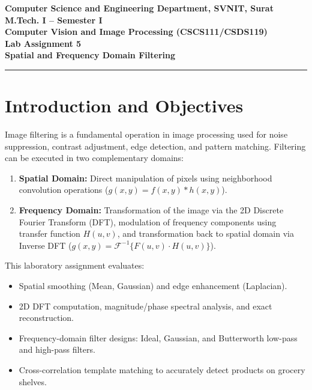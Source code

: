 \documentclass[12pt]{article}
\begin{document}

\begin{center}
\textbf{Computer Science and Engineering Department, SVNIT, Surat}\\
\textbf{M.Tech. I -- Semester I}\\
\textbf{Computer Vision and Image Processing (CSCS111/CSDS119)}\\
\textbf{Lab Assignment 5}\\
\textbf{Spatial and Frequency Domain Filtering}
\end{center}
\vspace{-4pt}
\hrule
\vspace{4pt}

\section{Introduction and Objectives}
Image filtering is a fundamental operation in image processing used for noise suppression, contrast adjustment, edge detection, and pattern matching. Filtering can be executed in two complementary domains:
\begin{enumerate}
    \item \textbf{Spatial Domain:} Direct manipulation of pixels using neighborhood convolution operations ($g(x, y) = f(x, y) * h(x, y)$).
    \item \textbf{Frequency Domain:} Transformation of the image via the 2D Discrete Fourier Transform (DFT), modulation of frequency components using transfer function $H(u, v)$, and transformation back to spatial domain via Inverse DFT ($g(x, y) = \mathcal{F}^{-1}\{F(u, v) \cdot H(u, v)\}$).
\end{enumerate}
This laboratory assignment evaluates:
\begin{itemize}
    \item Spatial smoothing (Mean, Gaussian) and edge enhancement (Laplacian).
    \item 2D DFT computation, magnitude/phase spectral analysis, and exact reconstruction.
    \item Frequency-domain filter designs: Ideal, Gaussian, and Butterworth low-pass and high-pass filters.
    \item Cross-correlation template matching to accurately detect products on grocery shelves.
\end{itemize}
\end{document}
